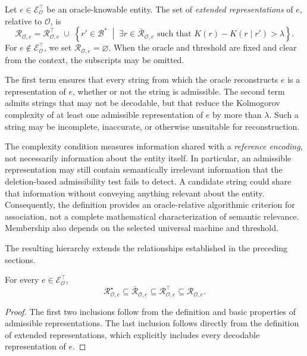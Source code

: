 \begin{definition}
\label{def:representations_of_entity}
Let $e\in\mathcal E^\top_{\mathcal O}$ be an oracle-knowable entity. The set of \emph{extended representations} of $e$, relative to $\mathcal O$, is
\[
\mathcal R_{\mathcal O,e} = \mathcal R^\top_{\mathcal O,e} \;\cup\; \left\{r'\in\mathcal B^\ast\;\middle|\;
\exists r\in\bar{\mathcal R}_{\mathcal O,e} \text{ such that }K(r)-K(r\mid r')>\lambda \right\}.
\]
For $e\notin\mathcal E^\top_{\mathcal O}$, we set $\mathcal R_{\mathcal O,e}=\varnothing$. When the oracle and threshold are fixed and clear from the context, the subscripts may be omitted.
\end{definition}

The first term ensures that every string from which the oracle reconstructs $e$ is a representation of $e$, whether or not the string is admissible. The second term admits strings that may not be decodable, but that reduce the Kolmogorov complexity of at least one admissible representation of $e$ by more than $\lambda$. Such a string may be incomplete, inaccurate, or otherwise unsuitable for reconstruction.

The complexity condition measures information shared with a \emph{reference encoding}, not necessarily information about the entity itself. In particular, an admissible representation may still contain semantically irrelevant information that the deletion-based admissibility test fails to detect. A candidate string could share that information without conveying anything relevant about the entity. Consequently, the definition provides an oracle-relative algorithmic criterion for association, not a complete mathematical characterization of semantic relevance. Membership also depends on the selected universal machine and threshold.

The resulting hierarchy extends the relationships established in the preceding sections.

\begin{proposition}
\label{prop:extended_representation_inclusions}
For every $e\in\mathcal E^\top_{\mathcal O}$,
\[
\mathcal R^\star_{\mathcal O,e} \subseteq \bar{\mathcal R}_{\mathcal O,e}
\subseteq \mathcal R^\top_{\mathcal O,e} \subseteq \mathcal R_{\mathcal O,e}.
\]
\end{proposition}

\begin{proof}
The first two inclusions follow from the definition and basic properties of admissible representations. The last inclusion follows directly from the definition of extended representations, which explicitly includes every decodable representation of $e$.
\end{proof}

